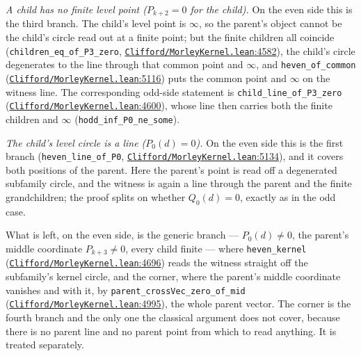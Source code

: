 \documentclass[11pt]{article}
\theoremstyle{definition}
\theoremstyle{remark}
\begin{document}
\emph{A child has no finite level point (\(P_{k+2} = 0\) for the child).} On the even side this is the third
branch. The child's level point is $\infty$, so the parent's object cannot be the child's circle read out at a
finite point; but the finite children all coincide (\texttt{children\_\allowbreak eq\_\allowbreak of\_\allowbreak P3\_\allowbreak zero},
\href{https://github.com/jpbald93/paperl_clifford_chain/blob/e1ae145c2565cc98816635387412edc0a740c27c/Clifford/MorleyKernel.lean\#L4582}{\texttt{Clifford/\allowbreak MorleyKernel.lean}:4582}), the child's circle degenerates to the line through that common point
and $\infty$, and \texttt{heven\_\allowbreak of\_\allowbreak common} (\href{https://github.com/jpbald93/paperl_clifford_chain/blob/e1ae145c2565cc98816635387412edc0a740c27c/Clifford/MorleyKernel.lean\#L5116}{\texttt{Clifford/\allowbreak MorleyKernel.lean}:5116}) puts the common point and $\infty$ on the
witness line. The corresponding odd-side statement is \texttt{child\_\allowbreak line\_\allowbreak of\_\allowbreak P3\_\allowbreak zero}
(\href{https://github.com/jpbald93/paperl_clifford_chain/blob/e1ae145c2565cc98816635387412edc0a740c27c/Clifford/MorleyKernel.lean\#L4600}{\texttt{Clifford/\allowbreak MorleyKernel.lean}:4600}), whose line then carries both the finite children and $\infty$
(\texttt{hodd\_\allowbreak inf\_\allowbreak P0\_\allowbreak ne\_\allowbreak some}).

\emph{The child's level circle is a line (\(P_0(d) = 0\)).} On the even side this is the first branch
(\texttt{heven\_\allowbreak line\_\allowbreak of\_\allowbreak P0}, \href{https://github.com/jpbald93/paperl_clifford_chain/blob/e1ae145c2565cc98816635387412edc0a740c27c/Clifford/MorleyKernel.lean\#L5134}{\texttt{Clifford/\allowbreak MorleyKernel.lean}:5134}), and it covers both positions of the parent.
Here the parent's point is read off a degenerated subfamily circle, and the witness is again a line
through the parent and the finite grandchildren; the proof splits on whether \(Q_0(d) = 0\), exactly as in
the odd case.

What is left, on the even side, is the generic branch --- \(P_0(d) \ne 0\), the parent's middle coordinate
\(P_{k+3} \ne 0\), every child finite --- where \texttt{heven\_\allowbreak kernel} (\href{https://github.com/jpbald93/paperl_clifford_chain/blob/e1ae145c2565cc98816635387412edc0a740c27c/Clifford/MorleyKernel.lean\#L4696}{\texttt{Clifford/\allowbreak MorleyKernel.lean}:4696}) reads the
witness straight off the subfamily's kernel circle, and the corner, where the parent's middle coordinate
vanishes and with it, by \texttt{parent\_\allowbreak crossVec\_\allowbreak zero\_\allowbreak of\_\allowbreak mid} (\href{https://github.com/jpbald93/paperl_clifford_chain/blob/e1ae145c2565cc98816635387412edc0a740c27c/Clifford/MorleyKernel.lean\#L4995}{\texttt{Clifford/\allowbreak MorleyKernel.lean}:4995}), the whole
parent vector. The corner is the fourth branch and the only one the classical argument does not cover,
because there is no parent line and no parent point from which to read anything. It is treated
separately.
\end{document}
